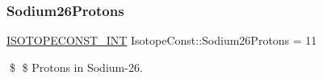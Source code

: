 \subsubsection{\texorpdfstring{Sodium26\+Protons}{Sodium26Protons}}
{\footnotesize\ttfamily \mbox{\hyperlink{group___isotope_const-_macros_ga5f18360b3e99483a35c32d789e62621c}{I\+S\+O\+T\+O\+P\+E\+C\+O\+N\+S\+T\+\_\+\+I\+NT}} Isotope\+Const\+::\+Sodium26\+Protons = 11}

\$ \$ Protons in Sodium-\/26. 